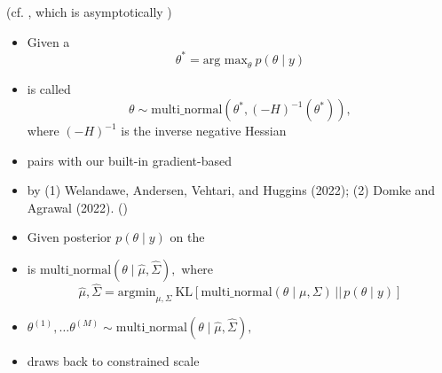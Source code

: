 \documentclass[9pt]{report}
\newcommand{\draw}[2]{#1^{(#2)}}
\begin{document}
\sld{}
\vfill
\begin{center}
  {\Huge {}}
\end{center}
\vfill 
\vfill 
\begin{center}
{\Large  (cf. , which is asymptotically )}
\end{center}

\begin{itemize}
\item Given a 
  $$\theta^* = \textrm{arg max}_\theta \ p(\theta \mid y)$$
\item {} is called 
  $$\theta \sim \textrm{multi\_normal}(\theta^*, (-H)^{-1}(\theta^*)),$$
  where $(-H)^{-1}$ is the inverse negative Hessian
\item pairs with our built-in gradient-based 
  \vfill
\item {} by (1) Welandawe, Andersen, Vehtari, and
  Huggins (2022); (2) Domke and Agrawal (2022).  ()
\end{itemize}

\begin{itemize}
\item Given posterior $p(\theta \mid y)$ on the
\item {} is $\textrm{multi\_normal}\!\left(\theta \mid
  \widehat{\mu}, \widehat{\Sigma}\right),$ where
    $$
  \widehat{\mu}, \widehat{\Sigma}
  = \textrm{argmin}_{\mu, \Sigma}
  \ \textrm{KL}\!\left[\textrm{multi\_normal}(\theta \mid \mu, \Sigma) 
    \,\big|\big|\, p(\theta \mid y) \right]
  $$
\item {} $\draw{\theta}{1}, \ldots \draw{\theta}{M} \sim \textrm{multi\_normal}\!\left(\theta \mid
    \widehat{\mu}, \widehat{\Sigma}\right),$
\item {} draws back to constrained scale
\end{itemize}
\end{document}
